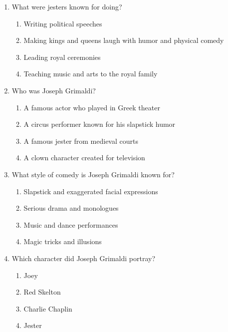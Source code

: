 \documentclass[12pt]{article}
\begin{document}
\begin{enumerate}
    \vspace{0.5cm}

    \item What were jesters known for doing?

    \begin{enumerate}[label=\Alph*.]
        \item Writing political speeches
        \item Making kings and queens laugh with humor and physical comedy
        \item Leading royal ceremonies
        \item Teaching music and arts to the royal family
    \end{enumerate}
    
    \vspace{0.5cm}

    \item Who was Joseph Grimaldi?

    \begin{enumerate}[label=\Alph*.]
        \item A famous actor who played in Greek theater
        \item A circus performer known for his slapstick humor
        \item A famous jester from medieval courts
        \item A clown character created for television
    \end{enumerate}
    
    \vspace{0.5cm}

    \item What style of comedy is Joseph Grimaldi known for?

    \begin{enumerate}[label=\Alph*.]
        \item Slapstick and exaggerated facial expressions
        \item Serious drama and monologues
        \item Music and dance performances
        \item Magic tricks and illusions
    \end{enumerate}
    
    \vspace{0.5cm}

    \item Which character did Joseph Grimaldi portray?

    \begin{enumerate}[label=\Alph*.]
        \item Joey
        \item Red Skelton
        \item Charlie Chaplin
        \item Jester
    \end{enumerate}
    

\end{enumerate}
\end{document}
